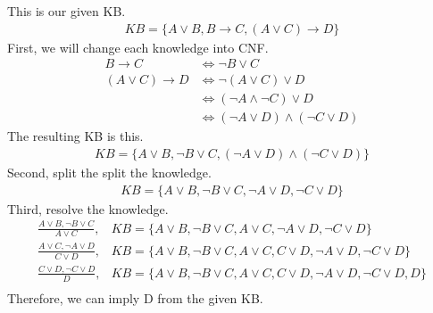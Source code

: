 \documentclass[12pt]{article}
\begin{document}
This is our given KB.
\begin{align*}
KB = \{ A \lor B, B \rightarrow C, (A \lor C) \rightarrow D \}
\end{align*}
First, we will change each knowledge into CNF.
\begin{align*}
B \rightarrow C & \iff \lnot B \lor C \\
(A \lor C) \rightarrow D & \iff \lnot (A \lor C ) \lor D \\
& \iff (\lnot A \land \lnot C) \lor D \\
& \iff (\lnot A \lor D) \land (\lnot C \lor D)
\end{align*}
The resulting KB is this.
\begin{align*}
KB = \{A \lor B, \lnot B \lor C, (\lnot A \lor D) \land (\lnot C \lor D)\}
\end{align*}
Second, split the split the knowledge.
\begin{align*}
KB = \{A \lor B, \lnot B \lor C, \lnot A \lor D, \lnot C \lor D\}
\end{align*}
Third, resolve the knowledge.
\begin{align*}
\frac{A \lor B, \lnot B \lor C}{A \lor C}, & KB = \{A \lor B, \lnot B \lor C, A \lor C, \lnot A \lor D, \lnot C \lor D \} \\
\frac{A \lor C, \lnot A \lor D}{C \lor D}, & KB = \{A \lor B, \lnot B \lor C, A \lor C,C \lor D, \lnot A \lor D, \lnot C \lor D \} \\
\frac{C \lor D, \lnot C \lor D}{D}, & KB = \{A \lor B, \lnot B \lor C, A \lor C,C \lor D, \lnot A \lor D, \lnot C \lor D, D \} \\
\end{align*}
Therefore, we can imply D from the given KB.
\end{document}
